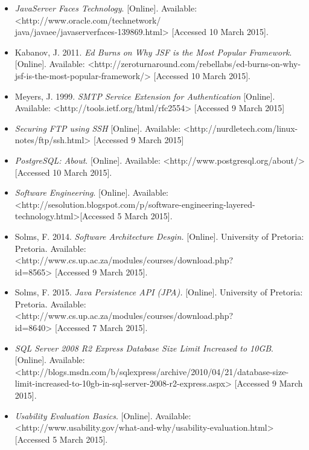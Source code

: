 \documentclass[a4paper,12pt]{article}
\begin{document}
\begin{itemize}
			\item \textit{JavaServer Faces Technology}. [Online]. Available: <http://www.oracle.com/technetwork/\\java/javaee/javaserverfaces-139869.html> [Accessed 10 March 2015].

			\item Kabanov, J. 2011. \textit{Ed Burns on Why JSF is the Most Popular Framework}. [Online]. Available: <http://zeroturnaround.com/rebellabs/ed-burns-on-why-jsf-is-the-most-popular-framework/> [Accessed 10 March 2015].
			\item Meyers, J. 1999. \textit{SMTP Service Extension for Authentication} [Online]. Available: <http://tools.ietf.org/html/rfc2554> [Accessed 9 March 2015]

			\item \textit{Securing FTP using SSH} [Online]. Available: <http://nurdletech.com/linux-notes/ftp/ssh.html> [Accessed 9 March 2015]

			\item \textit{PostgreSQL: About}. [Online]. Available: <http://www.postgresql.org/about/> [Accessed 10 March 2015].
			
			\item \textit{Software Engineering}. [Online]. Available: <http://sesolution.blogspot.com/p/software-engineering-layered-technology.html>[Accessed 5 March 2015].
								
			\item Solms, F. 2014. \textit{Software Architecture Desgin.} [Online]. University of Pretoria: Pretoria. Available: <http://www.cs.up.ac.za/modules/courses/download.php?\\id=8565> [Accessed 9 March 2015].
			
			\item Solms, F. 2015. \textit{Java Persistence API (JPA).} [Online]. University of Pretoria: Pretoria. Available: <http://www.cs.up.ac.za/modules/courses/download.php?\\id=8640> [Accessed 7 March 2015].
			
			\item \textit{SQL Server 2008 R2 Express Database Size Limit Increased to 10GB}. [Online]. Available: <http://blogs.msdn.com/b/sqlexpress/archive/2010/04/21/database-size-limit-increased-to-10gb-in-sql-server-2008-r2-express.aspx> [Accessed 9 March 2015].
			
			\item \textit{Usability Evaluation Basics}. [Online]. Available: <http://www.usability.gov/what-and-why/usability-evaluation.html> [Accessed 5 March 2015].


\end{itemize}
\end{document}
